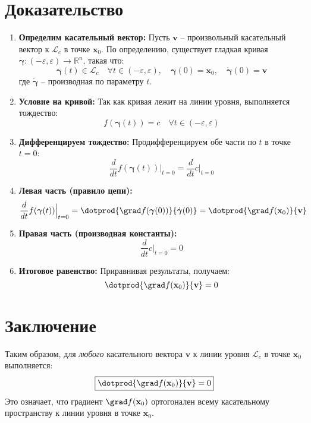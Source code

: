 \section*{Доказательство}
\begin{enumerate}
    \item \textbf{Определим касательный вектор:} Пусть $\mathbf{v}$ -- произвольный касательный вектор к $\mathcal{L}_c$ в точке $\mathbf{x}_0$. 
    По определению, существует гладкая кривая $\boldsymbol{\gamma}: (-\varepsilon, \varepsilon) \to \mathbb{R}^n$, такая что:
    \[
    \boldsymbol{\gamma}(t) \in \mathcal{L}_c \quad \forall t \in (-\varepsilon, \varepsilon), \quad 
    \boldsymbol{\gamma}(0) = \mathbf{x}_0, \quad 
    \dot{\boldsymbol{\gamma}}(0) = \mathbf{v}
    \]
    где $\dot{\boldsymbol{\gamma}}$ -- производная по параметру $t$.

    \item \textbf{Условие на кривой:} Так как кривая лежит на линии уровня, выполняется тождество:
    \[
    f(\boldsymbol{\gamma}(t)) = c \quad \forall t \in (-\varepsilon, \varepsilon)
    \]

    \item \textbf{Дифференцируем тождество:} Продифференцируем обе части по $t$ в точке $t=0$:
    \[
    \frac{d}{dt} f(\boldsymbol{\gamma}(t)) \Big|_{t=0} = \frac{d}{dt} c \Big|_{t=0}
    \]

    \item \textbf{Левая часть (правило цепи):} 
    \[
    \frac{d}{dt} f(\boldsymbol{\gamma}(t)) \Big|_{t=0} = 
    \dotprod{\grad f(\boldsymbol{\gamma}(0))}{\dot{\boldsymbol{\gamma}}(0)} = 
    \dotprod{\grad f(\mathbf{x}_0)}{\mathbf{v}}
    \]

    \item \textbf{Правая часть (производная константы):}
    \[
    \frac{d}{dt} c \Big|_{t=0} = 0
    \]

    \item \textbf{Итоговое равенство:} Приравнивая результаты, получаем:
    \[
    \dotprod{\grad f(\mathbf{x}_0)}{\mathbf{v}} = 0
    \]
\end{enumerate}

\section*{Заключение}
Таким образом, для \emph{любого} касательного вектора $\mathbf{v}$ к линии уровня $\mathcal{L}_c$ в точке $\mathbf{x}_0$ выполняется:
\[
\boxed{\dotprod{\grad f(\mathbf{x}_0)}{\mathbf{v}} = 0}
\]
Это означает, что градиент $\grad f(\mathbf{x}_0)$ ортогонален всему касательному пространству к линии уровня в точке $\mathbf{x}_0$.



